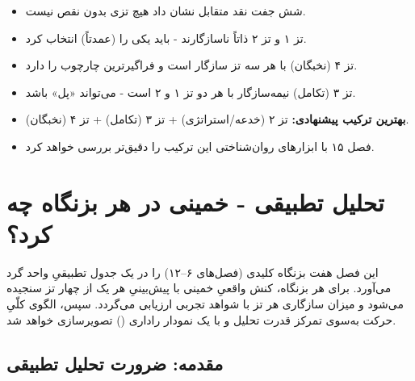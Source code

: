 \documentclass[12pt,a4paper]{book}
\newcommand{\keyword}[1]{\textbf{\textcolor{cPrimary}{#1}}}
\newcommand{\en}[1]{\lr{\textit{#1}}}
\begin{document}
\begin{principleBox}
\begin{itemize}[label=\textcolor{cPrimary}{$\blacksquare$}, rightmargin=2em]
    \item شش جفت نقد متقابل نشان داد هیچ تزی بدون نقص نیست.
    \item تز ۱ و تز ۲ ذاتاً ناسازگارند - باید یکی را (عمدتاً) انتخاب کرد.
    \item تز ۴ (نخبگان) با هر سه تز سازگار است و فراگیرترین چارچوب را دارد.
    \item تز ۳ (تکامل) نیمه‌سازگار با هر دو تز ۱ و ۲ است - می‌تواند «پل» باشد.
    \item \keyword{بهترین ترکیب پیشنهادی:} تز ۲ (خدعه/استراتژی) + تز ۳ (تکامل) + تز ۴ (نخبگان).
    \item فصل ۱۵ با ابزارهای روان‌شناختی این ترکیب را دقیق‌تر بررسی خواهد کرد.
\end{itemize}
\end{principleBox}







\chapter{تحلیل تطبیقی - خمینی در هر بزنگاه چه کرد؟}
\label{ch:comparative}

\begin{infoBox}
این فصل هفت بزنگاه کلیدی (فصل‌های ۶–۱۲) را در یک جدول تطبیقیِ واحد گرد می‌آورد.
برای هر بزنگاه، کنش واقعیِ خمینی با پیش‌بینیِ هر یک از چهار تز سنجیده می‌شود
و میزان سازگاری هر تز با شواهد تجربی ارزیابی می‌گردد.
سپس، الگوی کلّیِ حرکت به‌سوی تمرکز قدرت تحلیل و با یک نمودار راداری
(\en{radar chart}) تصویر‌سازی خواهد شد.
\end{infoBox}

\section{مقدمه: ضرورت تحلیل تطبیقی}
\label{sec:ch13-intro}
\end{document}
